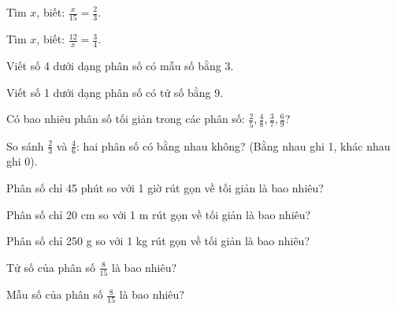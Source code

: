 \begin{ex}
Tìm $x$, biết: $\frac{x}{15} = \frac{2}{3}$.
\end{ex}

\begin{ex}
Tìm $x$, biết: $\frac{12}{x} = \frac{3}{4}$.
\end{ex}

\begin{ex}
Viết số 4 dưới dạng phân số có mẫu số bằng 3.
\end{ex}

\begin{ex}
Viết số 1 dưới dạng phân số có tử số bằng 9.
\end{ex}

\begin{ex}
Có bao nhiêu phân số tối giản trong các phân số: $\frac{2}{5}, \frac{4}{8}, \frac{3}{7}, \frac{6}{9}$?
\end{ex}

\begin{ex}
So sánh $\frac{2}{3}$ và $\frac{4}{6}$: hai phân số có bằng nhau không? (Bằng nhau ghi 1, khác nhau ghi 0).
\end{ex}

\begin{ex}
Phân số chỉ 45 phút so với 1 giờ rút gọn về tối giản là bao nhiêu?
\end{ex}

\begin{ex}
Phân số chỉ 20 cm so với 1 m rút gọn về tối giản là bao nhiêu?
\end{ex}

\begin{ex}
Phân số chỉ 250 g so với 1 kg rút gọn về tối giản là bao nhiêu?
\end{ex}

\begin{ex}
Tử số của phân số $\frac{8}{15}$ là bao nhiêu?
\end{ex}

\begin{ex}
Mẫu số của phân số $\frac{8}{15}$ là bao nhiêu?
\end{ex}

